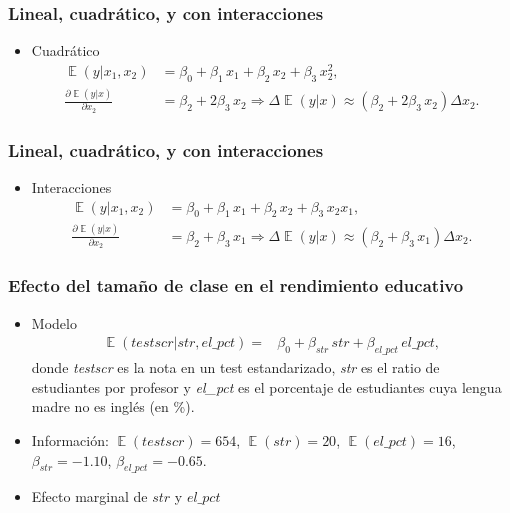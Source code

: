\documentclass[t, compress, spanish, aspectratio=169]{beamer}
\DeclareMathOperator{\E}{\mathbb{E}}
\begin{document}
    \begin{frame}
        \frametitle{Lineal, cuadr\'atico, y con interacciones}
        \begin{itemize}
            \item Cuadr\'atico
            \begin{align*}
            		\E(y|x_{1},x_{2})&=\beta_0 + \beta_1 \,x_{1}+\beta_2 \,x_{2}+\beta_3 \, x_{2}^2, \\
           		 \frac{\partial \E(y|x)}{\partial x_2} & = \beta_2 + 2 \beta_3 \,x_{2} \Rightarrow \Delta \E(y|x) \approx (\beta_2 + 2 \beta_3 \,x_{2}) \Delta x_2.
            \end{align*}
        \end{itemize}
    \end{frame}
    
        \begin{frame}
        \frametitle{Lineal, cuadr\'atico, y con interacciones}
        \begin{itemize}
            \item Interacciones
            \begin{align*}
            		\E(y|x_{1},x_{2})&=\beta_0 + \beta_1 \,x_{1}+\beta_2 \,x_{2}+\beta_3 \, x_{2} x_{1}, \\
            \frac{\partial \E(y|x)}{\partial x_2} & = \beta_2 + \beta_3 \,x_{1}\Rightarrow \Delta \E(y|x) \approx (\beta_2 + \beta_3 \,x_{1}) \Delta x_2.
            \end{align*}
        \end{itemize}
    \end{frame}
    
        
    \begin{frame}
        \frametitle{Efecto del tama\~no de clase en el rendimiento educativo}
        \begin{itemize}
            \item Modelo
            \begin{align*}
            		\E(testscr|str,el\_pct) =& \beta_0 +\beta_{str} \,str +\beta_{el\_pct}\, el\_pct,
            \end{align*}
            donde \emph{testscr} es la nota en un test estandarizado, \emph{str} es el ratio de estudiantes por profesor y \emph{el\_pct} es el porcentaje de estudiantes cuya lengua madre no es ingl\'es (en \%).
            \item Informaci\'on: $\E(testscr)=654$, $\E(str)=20$, $\E(el\_pct)=16$, $\beta_{str}=-1.10$, $\beta_{el\_pct}=-0.65$.
            \item Efecto marginal de $str$ y $el\_pct$
        \end{itemize}
    \end{frame}
    
\end{document}
